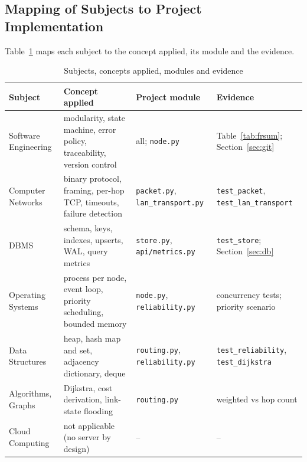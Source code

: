 \subsection{Mapping of Subjects to Project Implementation}
Table~\ref{tab:subjmap} maps each subject to the concept applied, its module and the evidence.
\begin{table}[!htbp]
\caption{Subjects, concepts applied, modules and evidence}
\label{tab:subjmap}
\footnotesize
\begin{tabularx}{\textwidth}{@{}>{\raggedright\arraybackslash}p{2.6cm}>{\raggedright\arraybackslash}X>{\raggedright\arraybackslash}p{3.4cm}>{\raggedright\arraybackslash}p{3.5cm}@{}}
\toprule
\textbf{Subject} & \textbf{Concept applied} & \textbf{Project module} & \textbf{Evidence}\\ \midrule
Software Engineering & modularity, state machine, error policy, traceability, version control & all; \texttt{node.py} & Table~\ref{tab:frsum}; Section~\ref{sec:git}\\
Computer Networks & binary protocol, framing, per-hop TCP, timeouts, failure detection & \texttt{packet.py}, \texttt{lan\_transport.py} & \texttt{test\_packet}, \texttt{test\_lan\_transport}\\
DBMS & schema, keys, indexes, upserts, WAL, query metrics & \texttt{store.py}, \texttt{api/metrics.py} & \texttt{test\_store}; Section~\ref{sec:db}\\
Operating Systems & process per node, event loop, priority scheduling, bounded memory & \texttt{node.py}, \texttt{reliability.py} & concurrency tests; priority scenario\\
Data Structures & heap, hash map and set, adjacency dictionary, deque & \texttt{routing.py}, \texttt{reliability.py} & \texttt{test\_reliability}, \texttt{test\_dijkstra}\\
Algorithms, Graphs & Dijkstra, cost derivation, link-state flooding & \texttt{routing.py} & weighted vs hop count\\
Cloud Computing & not applicable (no server by design) & -- & --\\
\bottomrule
\end{tabularx}
\end{table}
